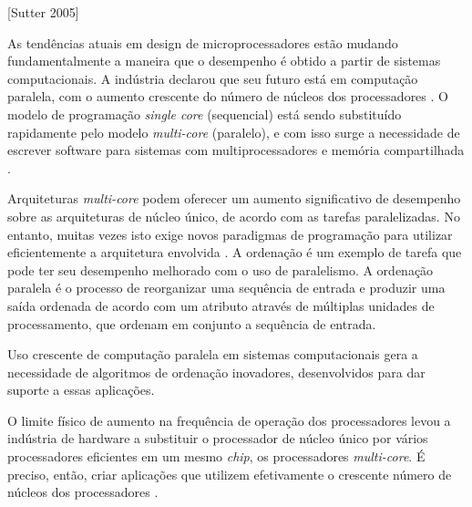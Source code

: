  [Sutter 2005]



As tendências atuais em design de microprocessadores estão mudando fundamentalmente a maneira que o desempenho é obtido a partir de sistemas computacionais. 
A indústria declarou que seu futuro está em computação paralela, com o aumento crescente do número de núcleos dos processadores \citep{Asanovic:2009}.
O modelo de programação \textit{single core} (sequencial) está sendo substituído rapidamente pelo modelo \textit{multi-core} (paralelo), e com isso surge a necessidade de escrever software para sistemas com multiprocessadores e memória compartilhada \citep{Ernst:2009}.

Arquiteturas \textit{multi-core} podem oferecer um aumento significativo de desempenho sobre as arquiteturas de núcleo único, de acordo com as tarefas paralelizadas. No entanto, muitas vezes isto exige novos paradigmas de programação para utilizar eficientemente a arquitetura envolvida \citep{Prinslow:2011}. A ordenação
é um exemplo de tarefa que pode ter seu desempenho melhorado com o uso de paralelismo. 
A ordenação paralela é o processo de reorganizar uma sequência de entrada e produzir uma saída ordenada de acordo com um atributo através de múltiplas unidades de processamento, que ordenam em conjunto a sequência de entrada. 


Uso crescente de computação paralela em sistemas computacionais gera a necessidade de algoritmos de ordenação inovadores, desenvolvidos para dar suporte a essas aplicações. 


O limite físico de aumento na frequência de operação dos processadores levou a indústria de hardware a substituir o processador de núcleo único por vários processadores eficientes em um mesmo \textit{chip}, os processadores \textit{multi-core}. 
É preciso, então, criar aplicações que utilizem efetivamente o crescente número de núcleos dos processadores  \citep{Asanovic:2009}.
